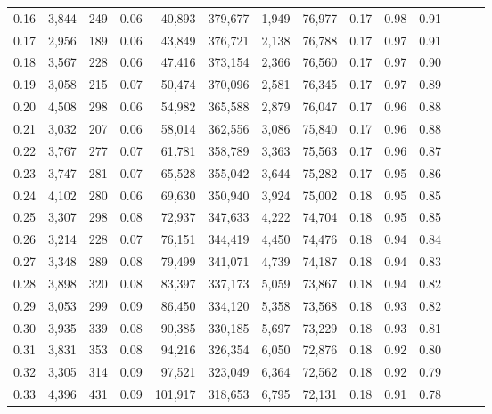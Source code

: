 \begin{tabular}{rrrrrrrrrrrrrr}
0.16 &   3,844 &    249 &  0.06 &   40,893 &  379,677 &   1,949 &  76,977 &  0.17 &  0.98 &      0.91 \\
0.17 &   2,956 &    189 &  0.06 &   43,849 &  376,721 &   2,138 &  76,788 &  0.17 &  0.97 &      0.91 \\
0.18 &   3,567 &    228 &  0.06 &   47,416 &  373,154 &   2,366 &  76,560 &  0.17 &  0.97 &      0.90 \\
0.19 &   3,058 &    215 &  0.07 &   50,474 &  370,096 &   2,581 &  76,345 &  0.17 &  0.97 &      0.89 \\
0.20 &   4,508 &    298 &  0.06 &   54,982 &  365,588 &   2,879 &  76,047 &  0.17 &  0.96 &      0.88 \\
0.21 &   3,032 &    207 &  0.06 &   58,014 &  362,556 &   3,086 &  75,840 &  0.17 &  0.96 &      0.88 \\
0.22 &   3,767 &    277 &  0.07 &   61,781 &  358,789 &   3,363 &  75,563 &  0.17 &  0.96 &      0.87 \\
0.23 &   3,747 &    281 &  0.07 &   65,528 &  355,042 &   3,644 &  75,282 &  0.17 &  0.95 &      0.86 \\
0.24 &   4,102 &    280 &  0.06 &   69,630 &  350,940 &   3,924 &  75,002 &  0.18 &  0.95 &      0.85 \\
0.25 &   3,307 &    298 &  0.08 &   72,937 &  347,633 &   4,222 &  74,704 &  0.18 &  0.95 &      0.85 \\
0.26 &   3,214 &    228 &  0.07 &   76,151 &  344,419 &   4,450 &  74,476 &  0.18 &  0.94 &      0.84 \\
0.27 &   3,348 &    289 &  0.08 &   79,499 &  341,071 &   4,739 &  74,187 &  0.18 &  0.94 &      0.83 \\
0.28 &   3,898 &    320 &  0.08 &   83,397 &  337,173 &   5,059 &  73,867 &  0.18 &  0.94 &      0.82 \\
0.29 &   3,053 &    299 &  0.09 &   86,450 &  334,120 &   5,358 &  73,568 &  0.18 &  0.93 &      0.82 \\
0.30 &   3,935 &    339 &  0.08 &   90,385 &  330,185 &   5,697 &  73,229 &  0.18 &  0.93 &      0.81 \\
0.31 &   3,831 &    353 &  0.08 &   94,216 &  326,354 &   6,050 &  72,876 &  0.18 &  0.92 &      0.80 \\
0.32 &   3,305 &    314 &  0.09 &   97,521 &  323,049 &   6,364 &  72,562 &  0.18 &  0.92 &      0.79 \\
0.33 &   4,396 &    431 &  0.09 &  101,917 &  318,653 &   6,795 &  72,131 &  0.18 &  0.91 &      0.78 \\

\end{tabular}
